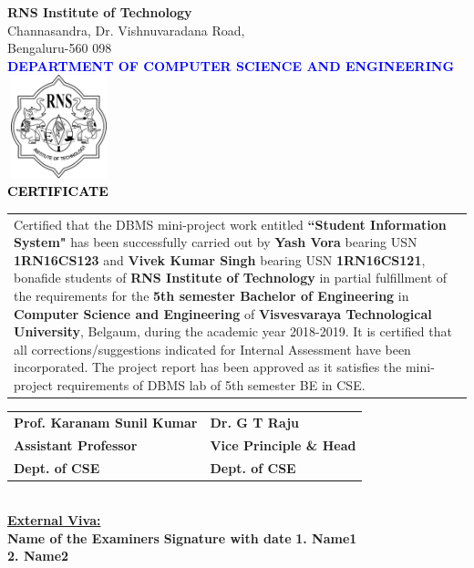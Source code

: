 \thispagestyle{empty}
\begin{center}
\break\break
\textup{\large {\textcolor{darkbrown}{\bf RNS Institute of Technology}} \\ 
{\normalsize{\textcolor{darkbrown}{Channasandra, Dr. Vishnuvaradana Road,\\ Bengaluru-560 098}}}}\\[0.1in]
\textup{\normalsize {\textcolor{blue}{\bf DEPARTMENT OF COMPUTER SCIENCE AND ENGINEERING}}}\\[0.1in]
\includegraphics[width=3cm, height=3cm]{./RNS_logo.png}\\[0.1in]
\textup{\large {\textcolor{black}{\textbf {CERTIFICATE}}}} \\[0.1in]
\end{center}

\justify
\begin{tabular}{p{15cm}}
\hspace{0.4cm} Certified that the DBMS mini-project work entitled \textbf{``Student Information System"} has been successfully carried out by \textbf{Yash Vora} bearing USN \textbf{1RN16CS123} and \textbf{Vivek Kumar Singh} bearing USN \textbf{1RN16CS121}, bonafide students of \textbf{RNS Institute of Technology } in partial fulfillment of the requirements for the \textbf{5th semester Bachelor of Engineering} in \textbf{Computer Science and Engineering} of \textbf{Visvesvaraya Technological University}, Belgaum, during the academic year 2018-2019. It is certified that all corrections/suggestions indicated for Internal Assessment have been incorporated. The project report has been approved as it satisfies the mini-project requirements of DBMS lab of 5th semester BE in CSE.\\[0.4in]
\end{tabular}

\justify
\begin{tabular}{l @{\hfill}  l}
\textbf{Prof. Karanam Sunil Kumar} & \hspace{6cm}\textbf{Dr. G T Raju}\\
\textbf{Assistant Professor} & \hspace{6cm}\textbf{Vice Principle \& Head}\\
\textbf{Dept. of CSE} & \hspace{6cm}\textbf{Dept. of CSE}\\[0.2in]
\end{tabular}
\\[0.1in]

\justify
\textup{\underline{\textbf{External Viva:}}} \\ 
\textup{\textbf{Name of the Examiners}}\hspace{7.3cm} {\textbf{Signature with date}} 
\justify
\textup{\textbf{1. Name1}} \\[0.2in]
\textup{\textbf{2. Name2}}
\newpage